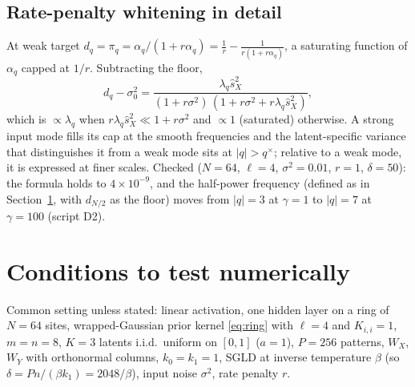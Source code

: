 \documentclass[11pt,a4paper]{article}
\newcommand{\sX}{\hat s_X^2}
\theoremstyle{remark}
\begin{document}
\subsection{Rate-penalty whitening in detail}
\label{sec:whiten}
At weak target $d_q = \pi_q = \alpha_q/(1+r\alpha_q) = \frac1r - \frac{1}{r(1+r\alpha_q)}$, a saturating function of $\alpha_q$ capped at $1/r$. Subtracting the floor,
\begin{equation}
  d_q - \sigma_0^2 = \frac{\lambda_q\sX}{(1+r\sigma^2)\,(1+r\sigma^2 + r\lambda_q\sX)} ,
\end{equation}
which is $\propto\lambda_q$ when $r\lambda_q\sX\ll1+r\sigma^2$ and $\propto1$ (saturated) otherwise. A strong input mode fills its cap at the smooth frequencies and the latent-specific variance that distinguishes it from a weak mode sits at $|q|>q^\times$; relative to a weak mode, it is expressed at finer scales. Checked ($N = 64$, $\ell = 4$, $\sigma^2 = 0.01$, $r = 1$, $\delta = 50$): the formula holds to $4\times10^{-9}$, and the half-power frequency (defined as in Section~\ref{sec:predictions}, with $d_{N/2}$ as the floor) moves from $|q| = 3$ at $\gamma = 1$ to $|q| = 7$ at $\gamma = 100$ (script D2).

\section{Conditions to test numerically}
\label{sec:predictions}
Common setting unless stated: linear activation, one hidden layer on a ring of $N = 64$ sites, wrapped-Gaussian prior kernel \eqref{eq:ring} with $\ell = 4$ and $K_{i,i} = 1$, $m = n = 8$, $K = 3$ latents i.i.d.\ uniform on $[0,1]$ ($a = 1$), $P = 256$ patterns, $W_X$, $W_Y$ with orthonormal columns, $k_0 = k_1 = 1$, SGLD at inverse temperature $\beta$ (so $\delta = Pn/(\beta k_1) = 2048/\beta$), input noise $\sigma^2$, rate penalty $r$.
\end{document}
